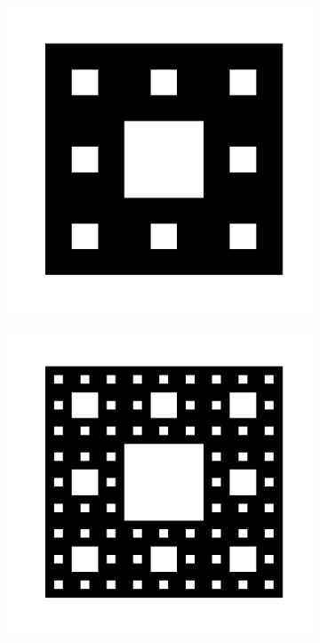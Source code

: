 \begin{figure}[h!]
\begin{subfigure}[b!]{0.27 \textwidth}
     \end{subfigure}\hspace*{-0.9em}
     \begin{subfigure}[b!]{0.27 \textwidth}
         \caption{}
         \includegraphics[width=\textwidth]{Imagenes/Fractal/sierpinski_carpet_3.pdf}
     \end{subfigure}\hspace*{-0.9em}
     \begin{subfigure}[b!]{0.27 \textwidth}
         \caption{}
         \includegraphics[width=\textwidth]{Imagenes/Fractal/sierpinski_carpet_4.pdf}

\end{subfigure}
\end{figure}
